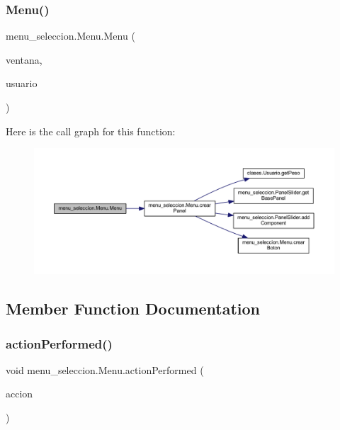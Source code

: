 \subsubsection{\texorpdfstring{Menu()}{Menu()}}
{\footnotesize\ttfamily menu\+\_\+seleccion.\+Menu.\+Menu (\begin{DoxyParamCaption}\item[{J\+Frame}]{ventana,  }\item[{\mbox{\hyperlink{classclases_1_1_usuario}{Usuario}}}]{usuario }\end{DoxyParamCaption})}

Here is the call graph for this function\+:
\nopagebreak
\begin{figure}[H]
\begin{center}
\leavevmode
\includegraphics[width=350pt]{classmenu__seleccion_1_1_menu_ab5f3ec49570a241ab7b6541dce6edba1_cgraph}
\end{center}
\end{figure}


\subsection{Member Function Documentation}
\mbox{\label{classmenu__seleccion_1_1_menu_a7a403c4df99f7687b71b83b698dbb678}} 
\subsubsection{\texorpdfstring{action\+Performed()}{actionPerformed()}}
{\footnotesize\ttfamily void menu\+\_\+seleccion.\+Menu.\+action\+Performed (\begin{DoxyParamCaption}\item[{Action\+Event}]{accion }\end{DoxyParamCaption})}

